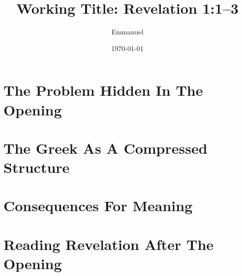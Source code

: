 \documentclass[11pt,oneside]{book}
\title{Working Title: Revelation 1:1--3}
\author{Emmanuel}
\date{\today}
\begin{document}
\frontmatter

\hypersetup{pageanchor=false}
\maketitle
\hypersetup{pageanchor=true}
\tableofcontents



\mainmatter

\part{The Problem Hidden In The Opening}




\part{The Greek As A Compressed Structure}






\part{Consequences For Meaning}







\part{Reading Revelation After The Opening}




\appendix






\backmatter

\nocite{*}
\printbibliography
\end{document}
